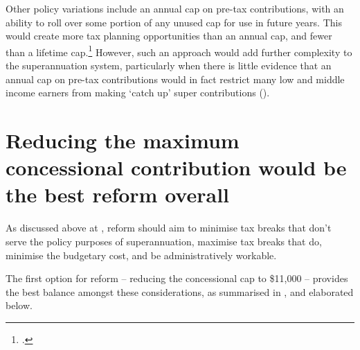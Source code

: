 \documentclass{grattanAlpha}
\begin{document}
Other policy variations include an annual cap on pre-tax contributions, with an ability to roll over some portion of any unused cap for use in future years. This would create more tax planning opportunities than an annual cap, and fewer than a lifetime cap.\footcite[][18]{Mercer2015SubmissionToReThink}  However, such an approach would add further complexity to the superannuation system, particularly when there is little evidence that an annual cap on pre-tax contributions would in fact restrict many low and middle income earners from making ‘catch up’ super contributions ().

\section{Reducing the maximum concessional contribution would be the best reform overall\label{sec:SUPER-4-6}}
As discussed above at , reform should aim to minimise tax breaks that don’t serve the policy purposes of superannuation, maximise tax breaks that do, minimise the budgetary cost, and be administratively workable.


The first option for reform – reducing the concessional cap to \$11,000 – provides the best balance amongst these considerations, as summarised in , and elaborated below.
\end{document}
